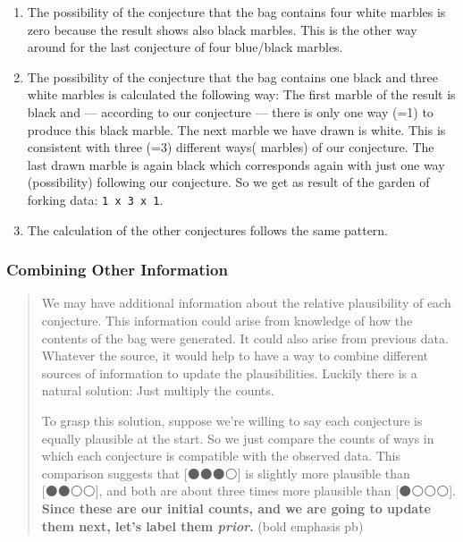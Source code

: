 \documentclass[
  letterpaper,
  DIV=11,
  numbers=noendperiod]{scrreprt}
\providecommand{\tightlist}{%
  \setlength{\itemsep}{0pt}\setlength{\parskip}{0pt}}\usepackage{longtable,booktabs,array}
\begin{document}
\begin{enumerate}
\def\labelenumi{\arabic{enumi}.}
\tightlist
\item
  The possibility of the conjecture that the bag contains four white
  marbles is zero because the result shows also black marbles. This is
  the other way around for the last conjecture of four blue/black
  marbles.
\item
  The possibility of the conjecture that the bag contains one black and
  three white marbles is calculated the following way: The first marble
  of the result is black and --- according to our conjecture --- there
  is only one way (=1) to produce this black marble. The next marble we
  have drawn is white. This is consistent with three (=3) different
  ways( marbles) of our conjecture. The last drawn marble is again black
  which corresponds again with just one way (possibility) following our
  conjecture. So we get as result of the garden of forking data:
  \texttt{1\ x\ 3\ x\ 1}.
\item
  The calculation of the other conjectures follows the same pattern.
\end{enumerate}

\hypertarget{combining-other-information}{%
\subsubsection{Combining Other
Information}\label{combining-other-information}}

\begin{quote}
We may have additional information about the relative plausibility of
each conjecture. This information could arise from knowledge of how the
contents of the bag were generated. It could also arise from previous
data. Whatever the source, it would help to have a way to combine
different sources of information to update the plausibilities. Luckily
there is a natural solution: Just multiply the counts.

To grasp this solution, suppose we're willing to say each conjecture is
equally plausible at the start. So we just compare the counts of ways in
which each conjecture is compatible with the observed data. This
comparison suggests that {[}⚫⚫⚫⚪{]} is slightly more plausible than
{[}⚫⚫⚪⚪{]}, and both are about three times more plausible than
{[}⚫⚪⚪⚪{]}. \textbf{Since these are our initial counts, and we are
going to update them next, let's label them \emph{prior}.} (bold
emphasis pb)
\end{quote}
\end{document}

